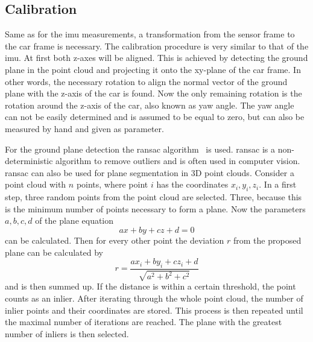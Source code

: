 \subsection{Calibration}
\label{ssec:calibration_lidar}
Same as for the \gls{imu} measurements, a transformation from the sensor frame to the car frame is necessary.
The calibration procedure is very similar to that of the \gls{imu}.
At first both z-axes will be aligned.
This is achieved by detecting the ground plane in the point cloud and projecting it onto the xy-plane of the car frame.
In other words, the necessary rotation to align the normal vector of the ground plane with the z-axis of the car is found.
Now the only remaining rotation is the rotation around the z-axis of the car, also known as yaw angle.
The yaw angle can not be easily determined and is assumed to be equal to zero, but can also be measured by hand and given as parameter.

For the ground plane detection the \gls{ransac} algorithm~\cite{Fischler1981} is used.
\gls{ransac} is a non-deterministic algorithm to remove outliers and is often used in computer vision.
\gls{ransac} can also be used for plane segmentation in 3D point clouds.
Consider a point cloud with $n$ points, where point $i$ has the coordinates $x_i, y_i, z_i$.
In a first step, three random points from the point cloud are selected.
Three, because this is the minimum number of points necessary to form a plane.
Now the parameters $a, b, c, d$ of the plane equation
\begin{equation}
    ax + by + cz + d = 0
\end{equation}
can be calculated.
Then for every other point the deviation $r$ from the proposed plane can be calculated by
\begin{equation}
    r = \frac{ax_i + by_i + cz_i + d}{\sqrt{a^2 + b^2 + c^2}}
\end{equation}
and is then summed up.
If the distance is within a certain threshold, the point counts as an inlier.
After iterating through the whole point cloud, the number of inlier points and their coordinates are stored.
This process is then repeated until the maximal number of iterations are reached.
The plane with the greatest number of inliers is then selected.

